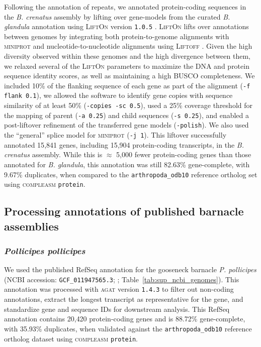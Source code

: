 Following the annotation of repeats, we annotated protein-coding sequences in the
\textit{B. crenatus} assembly by lifting over gene-models from the curated \textit{B.
glandula} annotation using \textsc{LiftOn} version \texttt{1.0.5}
\citep{chao_lifton_2024}.
\textsc{LiftOn} lifts over annotations between genomes by integrating both
protein-to-genome alignments with \textsc{miniprot} \citep{li_miniprot_2023} and
nucleotide-to-nucleotide alignments using \textsc{Liftoff} \citep{shumate_liftoff_2021}.
Given the high diversity observed within these genomes and the high divergence
between them, we relaxed several of the \textsc{LiftOn} parameters to maximize the
DNA and protein sequence identity scores, as well as maintaining a high \textsc{BUSCO}
completeness.
We included 10\% of the flanking sequence of each gene as part of the alignment
(\texttt{-f flank 0.1}), we allowed the software to identify gene copies with sequence
similarity of at least 50\% (\texttt{-copies -sc 0.5}), used a 25\% coverage
threshold for the mapping of parent (\texttt{-a 0.25}) and child sequences
(\texttt{-s 0.25}), and enabled a post-liftover refinement of the transferred
gene models (\texttt{-polish}).
We also used the ``general'' splice model for \textsc{miniprot} (\texttt{-j 1}).
This liftover successfully annotated 15{,}841 genes, including 15{,}904 protein-coding
transcripts, in the \textit{B. crenatus} assembly.
While this is $\approx$ 5{,}000 fewer protein-coding genes than those annotated for
\textit{B. glandula}, this annotation was still 82.63\% gene-complete, with 9.67\%
duplicates, when compared to the \texttt{arthropoda\_odb10} reference ortholog set
using \textsc{compleasm} \texttt{protein}.

\subsection*{Processing annotations of published barnacle assemblies}\label{sec:sup_methods_barnacle_rna}

\subsubsection*{\textit{Pollicipes pollicipes}}

We used the published RefSeq annotation for the gooseneck barnacle \textit{P.
pollicipes} (NCBI accession: \texttt{GCF\_011947565.3};
\cite{bernot_chromosome-level_2022}; Table~\ref{tab:sup_ncbi_genomes}).
This annotation was processed with \textsc{agat} version \texttt{1.4.3}
\citep{dainat_another_2022} to filter out non-coding annotations, extract the longest 
transcript as representative for the gene, and standardize gene and sequence IDs for
downstream analysis.
This RefSeq annotation contains 20{,}420 protein-coding genes and is 88.72\%
gene-complete, with 35.93\% duplicates, when validated against the
\texttt{arthropoda\_odb10} reference ortholog dataset using \textsc{compleasm}
\texttt{protein}.

